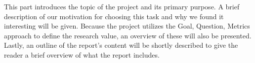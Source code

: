 This part introduces the topic of the project and its primary purpose. A brief description of our motivation for choosing this task and why we found it interesting will be given. Because the project utilizes the Goal, Question, Metrics approach to define the research value, an overview of these will also be presented. Lastly, an outline of the report’s content will be shortly described to give the reader a brief overview of what the report includes.

\clearpage


\clearpage


\clearpage


\clearpage


\clearpage

